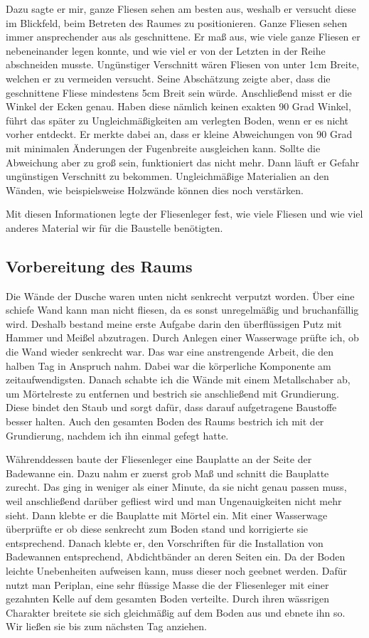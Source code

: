 Dazu sagte er mir, ganze Fliesen sehen am besten aus, weshalb er versucht diese im Blickfeld, beim Betreten des Raumes zu positionieren. Ganze Fliesen sehen immer ansprechender aus als geschnittene. Er maß aus, wie viele ganze Fliesen er nebeneinander legen konnte, und wie viel er von der Letzten in der Reihe abschneiden musste. Ungünstiger Verschnitt wären Fliesen von unter 1cm Breite, welchen er zu vermeiden versucht. Seine Abschätzung zeigte aber, dass die geschnittene Fliese mindestens 5cm Breit sein würde. Anschließend misst er die Winkel der Ecken genau. Haben diese nämlich keinen exakten 90 Grad Winkel, führt das später zu Ungleichmäßigkeiten am verlegten Boden, wenn er es nicht vorher entdeckt. Er merkte dabei an, dass er kleine Abweichungen von 90 Grad mit minimalen Änderungen der Fugenbreite ausgleichen kann. Sollte die Abweichung aber zu groß sein, funktioniert das nicht mehr. Dann läuft er Gefahr ungünstigen Verschnitt zu bekommen. Ungleichmäßige Materialien an den Wänden, wie beispielsweise Holzwände können dies noch verstärken.

Mit diesen Informationen legte der Fliesenleger fest, wie viele Fliesen und wie viel anderes Material wir für die Baustelle benötigten. 

\subsection{Vorbereitung des Raums}
 
Die Wände der Dusche waren unten nicht senkrecht verputzt worden. Über eine schiefe Wand kann man nicht fliesen, da es sonst unregelmäßig und bruchanfällig wird. Deshalb bestand meine erste Aufgabe darin den überflüssigen Putz mit Hammer und Meißel abzutragen. Durch Anlegen einer Wasserwage prüfte ich, ob die Wand wieder senkrecht war. Das war eine anstrengende Arbeit, die den halben Tag in Anspruch nahm. Dabei war die körperliche Komponente am zeitaufwendigsten. Danach schabte ich die Wände mit einem Metallschaber ab, um Mörtelreste zu entfernen und bestrich sie anschließend mit Grundierung. Diese bindet den Staub und sorgt dafür, dass darauf aufgetragene Baustoffe besser halten. Auch den gesamten Boden des Raums bestrich ich mit der Grundierung, nachdem ich ihn einmal gefegt hatte.

Währenddessen baute der Fliesenleger eine Bauplatte an der Seite der Badewanne ein. Dazu nahm er zuerst grob Maß und schnitt die Bauplatte zurecht. Das ging in weniger als einer Minute, da sie nicht genau passen muss, weil anschließend darüber gefliest wird und man Ungenauigkeiten nicht mehr sieht. Dann klebte er die Bauplatte mit Mörtel ein. Mit einer Wasserwage überprüfte er ob diese senkrecht zum Boden stand und korrigierte sie entsprechend. Danach klebte er, den Vorschriften für die Installation von Badewannen entsprechend, Abdichtbänder an deren Seiten ein. Da der Boden leichte Unebenheiten aufweisen kann, muss dieser noch geebnet werden. Dafür nutzt man Periplan, eine sehr flüssige Masse die der Fliesenleger mit einer gezahnten Kelle auf dem gesamten Boden verteilte. Durch ihren wässrigen Charakter breitete sie sich gleichmäßig auf dem Boden aus und ebnete ihn so. Wir ließen sie bis zum nächsten Tag anziehen. 

